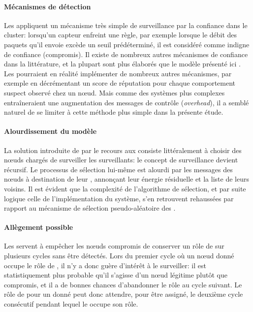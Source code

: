 \paragraph{Mécanismes de détection}
Les \cns appliquent un mécanisme très simple de surveillance par la confiance dans le cluster: lorsqu'un capteur enfreint une règle, par exemple lorsque le débit des paquets qu'il envoie excède un seuil prédéterminé, il est considéré comme indigne de confiance (compromis).
Il existe de nombreux autres mécanismes de confiance dans la littérature, et la plupart sont plus élaborés que le modèle présenté ici .
Les \cns pourraient en réalité implémenter de nombreux autres mécanismes, par exemple en décrémentant un score de réputation pour chaque comportement suspect observé chez un nœud.
Mais comme des systèmes plus complexes entraîneraient une augmentation des messages de contrôle (\textit{overhead}), il a semblé naturel de se limiter à cette méthode plus simple dans la présente étude.

\paragraph{Alourdissement du modèle}
La solution introduite de par le recours aux \vns consiste littéralement à choisir des nœuds chargés de surveiller les surveillants: le concept de surveillance devient récursif.
Le processus de sélection lui-même est alourdi par les messages des nœuds à destination de leur \ch, annonçant leur énergie résiduelle et la liste de leurs voisins.
Il est évident que la complexité de l'algorithme de sélection, et par suite logique celle de l'implémentation du système, s'en retrouvent rehaussées par rapport au mécanisme de sélection pseudo-aléatoire des \cns.

\paragraph{Allègement possible}
Les \vns servent à empêcher les nœuds compromis de conserver un rôle de \cn sur plusieurs cycles sans être détectés.
Lors du premier cycle où un nœud donné occupe le rôle de \cn, il n'y a donc guère d'intérêt à le surveiller: il est statistiquement plus probable qu'il s'agisse d'un nœud légitime plutôt que compromis, et il a de bonnes chances d'abandonner le rôle au cycle suivant.
Le rôle de \vn pour un \cn donné peut donc attendre, pour être assigné, le deuxième cycle consécutif pendant lequel le \cn occupe son rôle.

